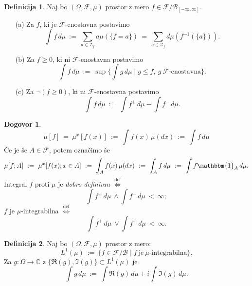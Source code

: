 \documentclass[11pt]{article}
\newcommand{\F}{\mathcal{F}}
\newcommand{\Z}{\mathcal{Z}}
\renewcommand{\L}{L}
\newcommand{\B}{\mathscr{B}}
\newcommand{\diff}{\overset{\text{def}}{\iff}}
\newcommand{\set}[1]{\{#1\}}
\newcommand{\1}{\mathbbm{1}}
\newcommand{\rr}{[-\infty,\infty]}
\theoremstyle{definition}
\newtheorem{definicija}{Definicija}[section]
\theoremstyle{definition}
\theoremstyle{definition}
\theoremstyle{definition}
\newtheorem*{dogovor}{Dogovor}
\begin{document}
\begin{definicija}

Naj bo $(\Omega, \F, \mu)$ prostor z mero $f \in \F/\B_{\rr}$.
\begin{enumerate}

\item[(a)] Za $f$, ki je $\F$-enostavna postavimo
$$\int f\,d\mu ~:=~ \sum_{a \in \Z_f} a\mu(\set{f=a}) ~=~ \sum_{a \in \Z_f} d\mu(f^{-1}(\set{a})).$$

\item[(b)] Za $f \geq 0$, ki ni $\F$-enostavna postavimo
$$\int f\,d\mu ~:=~ \sup\set{\int g\,d\mu \mid g \leq f,~ g ~\F\text{-enostavna}}.$$

\item[(c)] Za $\neg(f \geq 0)$, ki ni $\F$-enostavna postavimo
$$\int f\,d\mu ~:=~ \int f^+\,d\mu - \int f^-\,d\mu.$$

\end{enumerate}

\end{definicija}
\vspace{0.5cm}

\begin{dogovor}

$$\mu[f] ~=~ \mu^x[f(x)] ~:=~ \int f(x)\,\mu(dx) ~:=~ \int f\,d\mu$$
Če je še $A \in \F$, potem označimo še
$$\mu[f; A] ~:=~ \mu^x[f(x); x \in A] ~:=~ \int_A f(x)\,\mu(dx) ~:=~ \int_A f\,d\mu ~:=~ \int f\1_A\,d\mu.$$
Integral $f$ proti $\mu$ je \textit{dobro definiran} $\diff$
$$\int f^+\,d\mu ~\wedge \int f^-\,d\mu ~<~ \infty;$$
$f$ je $\mu$-integrabilna $\diff$
$$\int f^+\,d\mu ~\vee \int f^-\,d\mu ~<~ \infty.$$

\end{dogovor}
\vspace{0.5cm}

\begin{definicija}

Naj bo $(\Omega, \F, \mu)$ prostor z mero:
$$\L^1(\mu) ~:=~ \set{f \in \F/\B \mid f ~\text{je}~ \mu\text{-integrabilna}}.$$
Za $g: \Omega \rightarrow \mathbb{C}$ z $\set{\mathfrak{R}(g), \mathfrak{I}(g)} \subset \L^1(\mu)$ je
$$\int g\,d\mu ~:=~ \int \mathfrak{R}(g)\,d\mu + i\int \mathfrak{I}(g)\,d\mu.$$

\end{definicija}
\vspace{0.5cm}
\end{document}
